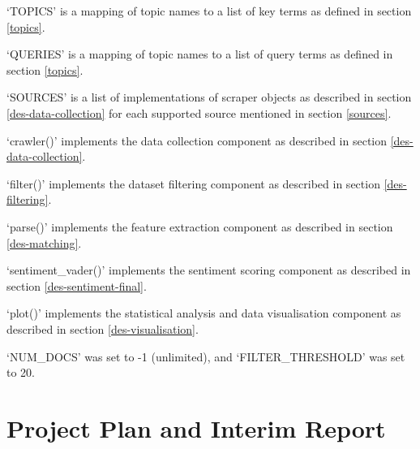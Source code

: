 \documentclass{report}
\begin{document}
`TOPICS' is a mapping of topic names to a list of key terms as defined in section \ref{topics}.

`QUERIES' is a mapping of topic names to a list of query terms as defined in section \ref{topics}.

`SOURCES' is a list of implementations of scraper objects as described in section \ref{des-data-collection} for each supported source mentioned in section \ref{sources}.

`crawler()' implements the data collection component as described in section \ref{des-data-collection}.

`filter()' implements the dataset filtering component as described in section \ref{des-filtering}.

`parse()' implements the feature extraction component as described in section \ref{des-matching}.

`sentiment\_vader()' implements the sentiment scoring component as described in section \ref{des-sentiment-final}.

`plot()' implements the statistical analysis and data visualisation component as described in section \ref{des-visualisation}.

`NUM\_DOCS' was set to -1 (unlimited), and `FILTER\_THRESHOLD' was set to 20.

\chapter{Project Plan and Interim Report}




\end{document}
